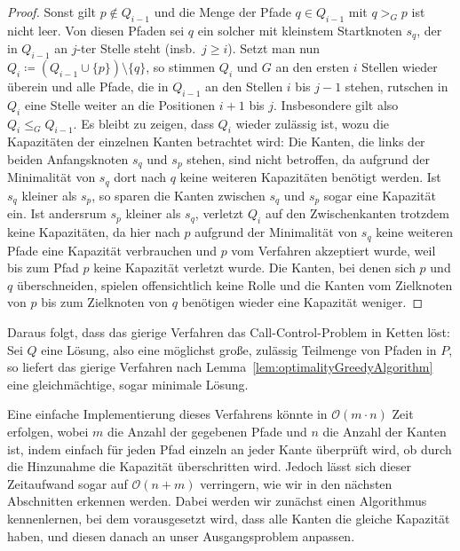 \begin{proof}
    Sonst gilt $p \notin Q_{i-1}$ und die Menge der Pfade $q \in Q_{i-1}$ mit $q >_G p$ ist nicht leer.
    Von diesen Pfaden sei $q$ ein solcher mit kleinstem Startknoten $s_q$, der in $Q_{i-1}$ an $j$-ter Stelle steht
    (insb.\ $j \geq i$).
    Setzt man nun $Q_{i} \coloneqq (Q_{i-1} \cup \{ p \}) \setminus \{ q \} $, so stimmen $Q_{i}$ und $G$ an den
    ersten $i$ Stellen wieder überein und alle Pfade, die in $Q_{i-1}$ an den Stellen $i$ bis $j-1$ stehen, rutschen
    in $Q_i$ eine Stelle weiter an die Positionen $i+1$ bis $j$.
    Insbesondere gilt also $Q_i \leq_G Q_{i-1}$.
    Es bleibt zu zeigen, dass $Q_i$ wieder zulässig ist, wozu die Kapazitäten der einzelnen Kanten betrachtet wird:
    Die Kanten, die links der beiden Anfangsknoten $s_q$ und $s_p$ stehen, sind nicht betroffen, da aufgrund der Minimalität
    von $s_q$ dort nach $q$ keine weiteren Kapazitäten benötigt werden.
    Ist $s_q$ kleiner als $s_p$, so sparen die Kanten zwischen $s_q$ und $s_p$ sogar eine Kapazität ein.
    Ist andersrum $s_p$ kleiner als $s_q$, verletzt $Q_i$ auf den Zwischenkanten trotzdem keine Kapazitäten, da
    hier nach $p$ aufgrund der Minimalität von $s_q$ keine weiteren Pfade eine Kapazität verbrauchen und $p$ vom
    Verfahren akzeptiert wurde, weil bis zum Pfad $p$ keine Kapazität verletzt wurde.
    Die Kanten, bei denen sich $p$ und $q$ überschneiden, spielen offensichtlich keine Rolle und die Kanten
    vom Zielknoten von $p$ bis zum Zielknoten von $q$ benötigen wieder eine Kapazität weniger.
\end{proof}

Daraus folgt, dass das gierige Verfahren das Call-Control-Problem in Ketten löst:
Sei $Q$ eine Lösung, also eine möglichst große, zulässig Teilmenge von Pfaden in $P$, so liefert das gierige
Verfahren nach Lemma~\ref{lem:optimalityGreedyAlgorithm} eine gleichmächtige, sogar minimale Lösung.

Eine einfache Implementierung dieses Verfahrens könnte in $\mathcal O(m \cdot n)$ Zeit erfolgen, wobei $m$ die Anzahl der gegebenen
Pfade und $n$ die Anzahl der Kanten ist, indem einfach für jeden Pfad einzeln an jeder Kante überprüft wird, ob durch
die Hinzunahme die Kapazität überschritten wird.
Jedoch lässt sich dieser Zeitaufwand sogar auf $\mathcal O(n+m)$ verringern, wie wir in den nächsten Abschnitten erkennen werden.
Dabei werden wir zunächst einen Algorithmus kennenlernen, bei dem vorausgesetzt wird, dass alle Kanten die gleiche
Kapazität haben, und diesen danach an unser Ausgangsproblem anpassen.

